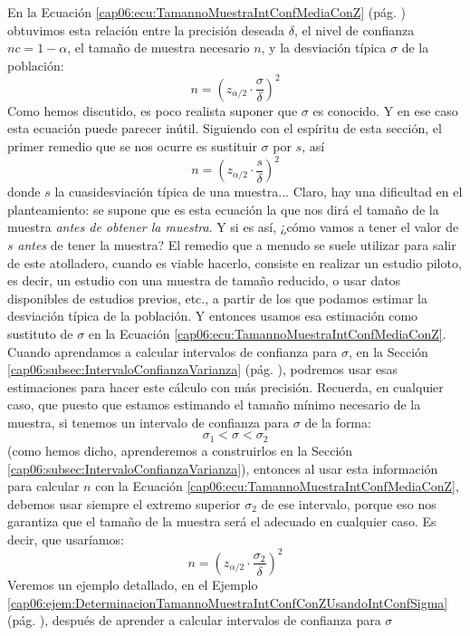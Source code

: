 En la Ecuación \ref{cap06:ecu:TamannoMuestraIntConfMediaConZ} (pág.
\pageref{cap06:ecu:TamannoMuestraIntConfMediaConZ}) obtuvimos esta relación entre la precisión
deseada $\delta$, el nivel de confianza $nc=1-\alpha$, el tamaño de muestra necesario $n$, y la
desviación típica $\sigma$ de la población:
\[n=\left(z_{\alpha/2}\cdot\dfrac{\sigma}{\delta}\right)^2\]
Como hemos discutido, es poco realista suponer que $\sigma$ es conocido. Y en ese caso esta
ecuación puede parecer inútil. Siguiendo con el espíritu de esta sección, el primer remedio que se
nos ocurre es sustituir $\sigma$ por $s$, así
\[n=\left(z_{\alpha/2}\cdot\dfrac{s}{\delta}\right)^2\]
donde $s$ la cuasidesviación típica de una muestra... Claro, hay una dificultad en el
planteamiento: se supone que es esta ecuación la que nos dirá el tamaño de la muestra {\em antes de
obtener la muestra}. Y si es así, ¿cómo vamos a tener el valor de $s$ {\em antes} de tener la
muestra? El remedio que a menudo se suele utilizar para salir de este atolladero, cuando es viable
hacerlo,  consiste en realizar un {\sf estudio piloto}, es decir, un estudio con una muestra de tamaño reducido, o usar datos disponibles de estudios previos, etc., a partir de los que podamos estimar la desviación típica de la población. Y entonces usamos esa estimación como sustituto de $\sigma$ en la Ecuación
\ref{cap06:ecu:TamannoMuestraIntConfMediaConZ}. Cuando aprendamos a calcular intervalos de
confianza para $\sigma$, en la Sección \ref{cap06:subsec:IntervaloConfianzaVarianza} (pág.
\pageref{cap06:subsec:IntervaloConfianzaVarianza}), podremos usar esas estimaciones para hacer este
cálculo con más precisión. Recuerda, en cualquier caso, que puesto que estamos estimando el tamaño
mínimo necesario de la muestra, si tenemos un intervalo de confianza para $\sigma$ de la forma:
\[\sigma_1 < \sigma < \sigma_2\]
(como hemos dicho, aprenderemos a construirlos en la Sección
\ref{cap06:subsec:IntervaloConfianzaVarianza}), entonces  al usar esta información para calcular
$n$ con la Ecuación \ref{cap06:ecu:TamannoMuestraIntConfMediaConZ}, debemos usar siempre el extremo
superior $\sigma_2$ de ese intervalo, porque eso nos garantiza que el tamaño de la muestra será el
adecuado en cualquier caso. Es decir, que usaríamos:
\[n=\left(z_{\alpha/2}\cdot\dfrac{\sigma_2}{\delta}\right)^2\]
Veremos un ejemplo detallado, en el Ejemplo
\ref{cap06:ejem:DeterminacionTamannoMuestraIntConfConZUsandoIntConfSigma} (pág.
\pageref{cap06:ejem:DeterminacionTamannoMuestraIntConfConZUsandoIntConfSigma}), después de aprender
a calcular intervalos de confianza para $\sigma$

